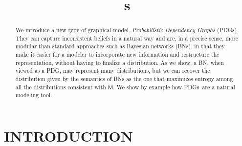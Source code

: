 \documentclass{article}
\title{\ModelName s}
\author{} %
\newcommand{\commentout}[1]{\ignorespaces}
\newcommand{\sfM}{\mathsf M}
\newcommand{\ModelName}{Probabilistic Dependency Graph}
\newcommand{\MN}{PDG}
\newcommand{\MNs}{\MN s}
\numberwithin{equation}{section}
\begin{document}
	\maketitle
	
	\begin{abstract}
		We introduce a new type of graphical model, \emph{\ModelName s} (\MNs).  
		They can capture inconsistent beliefs in a natural way and are, in a precise sense, more modular than standard
		approaches such as Bayesian networks (BNs), 
		in that they make it easier for	a modeler to incorporate new information 
		\commentout{without having to restructure
			the representation of current information.}
		and restructure the representation, without having to
		finalize a distribution. 
		\commentout{As we show, when viewed as a \MN, a BN $G$
			represents many}
		As we show, a BN, when viewed as a \MN,
		may represent many 
		distributions, but we can recover the distribution given by the
		semantics of BNs as 
		the one that maximizes entropy among all the distributions consistent
		with $\sfM$.  
		We show by example how \MNs\ are a natural modeling tool.
	\end{abstract}


	\section{INTRODUCTION}
\end{document}
